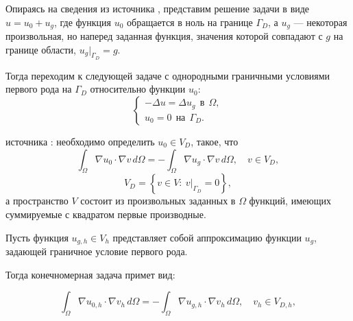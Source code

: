 \documentclass[12pt, a4paper]{article}
\begin{document}
			Опираясь на сведения из источника \cite{Galanin}, представим решение задачи в виде $u = u_0 + u_g$, где функция $u_0$ обращается в ноль на границе $\Gamma_D$, а $u_g$ --- некоторая произвольная, но наперед заданная функция, значения которой совпадают с $g$ на границе области, $u_g |_{\Gamma_D} = g$.
			
			Тогда переходим к следующей задаче с однородными граничными условиями первого рода на $\Gamma_D$ относительно функции $u_0$:
			\begin{equation*}
			\begin{cases}
				- \Delta u  = \Delta u_g \ \  \text{в}\ \  \Omega, \\
				u_0 = 0 \ \ \text{на}\ \  \Gamma_D.
			\end{cases}			
			\end{equation*}
			
			 источника \cite{Galanin}: необходимо определить $u_0 \in V_D$, такое, что 
			\begin{equation*}
				\int_{\Omega} \nabla u_0 \cdot \nabla v \, d\Omega = 
				- \int_{\Omega} \nabla u_g \cdot \nabla v \, d\Omega, \quad v \in V_D,
			\end{equation*}			
			\begin{equation*}
				V_D = \left\{ v \in V: \ v |_{\Gamma_D} = 0 \right\},
			\end{equation*}
			а пространство $V$ состоит из произвольных заданных в $\Omega$ функций, имеющих суммируемые с квадратом первые производные.
			
			
			Пусть функция $u_{g,h} \in V_h $ представляет собой аппроксимацию функции $u_g$, задающей граничное условие первого рода.
			
			Тогда конечномерная задача примет вид: 
			
			\begin{equation*}
				\int_{\Omega} \nabla u_{0,h} \cdot \nabla v_{h} \, d\Omega = 
				- \int_{\Omega} \nabla u_{g,h} \cdot \nabla v_{h} \, d\Omega, \quad v_{h} \in V_{D,h},
			\end{equation*}
			
\end{document}
